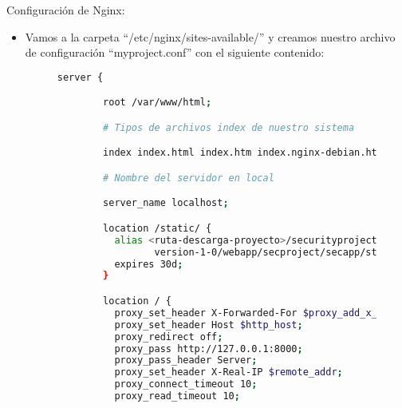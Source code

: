 Configuración de Nginx:
\begin{itemize}
\item Vamos a la carpeta ``/etc/nginx/sites-available/'' y creamos nuestro archivo de configuración ``myproject.conf'' con el siguiente contenido:

  \begin{figure}[H]
    \begin{lstlisting}[language=bash]
      server {

        root /var/www/html;

        # Tipos de archivos index de nuestro sistema

        index index.html index.htm index.nginx-debian.html;

        # Nombre del servidor en local

        server_name localhost;

        location /static/ {
          alias <ruta-descarga-proyecto>/securityproject/trunk/ \\
                 version-1-0/webapp/secproject/secapp/static/;
          expires 30d;
        }

        location / {
          proxy_set_header X-Forwarded-For $proxy_add_x_forwarded_for;
          proxy_set_header Host $http_host;
          proxy_redirect off;
          proxy_pass http://127.0.0.1:8000;
          proxy_pass_header Server;
          proxy_set_header X-Real-IP $remote_addr;
          proxy_connect_timeout 10;
          proxy_read_timeout 10;



\end{lstlisting}
\end{figure}
\end{itemize}
